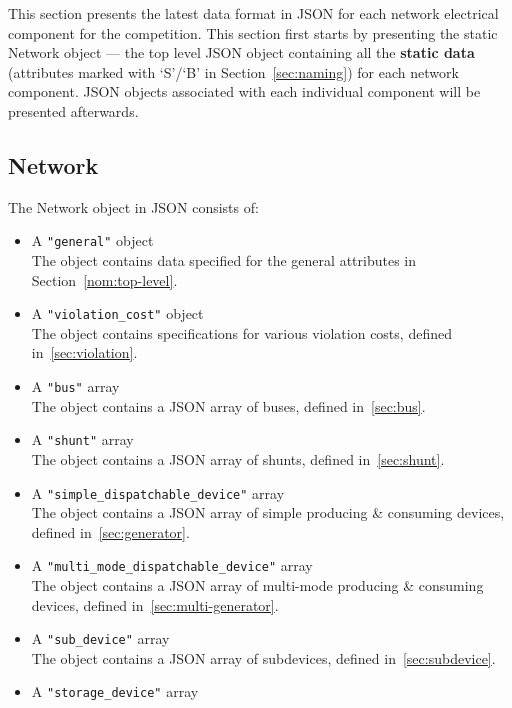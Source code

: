 This section presents the latest data format in JSON for 
each network electrical component for the competition.
This section first starts by presenting the static Network object ---
the top level JSON object containing all the \textbf{static data}
(attributes marked with `S'/`B' in Section~\ref{sec:naming}) for each network component.
JSON objects associated with each individual component will be presented afterwards.

\subsection{Network}
\label{sec:network}
The Network object in JSON consists of: 
\begin{itemize}
    \item A \texttt{"general"} object\\
    The object contains data specified for the general attributes in Section~\ref{nom:top-level}.
    \item A \texttt{"violation\_cost"} object\\
    The object contains specifications for various violation costs, defined in~\ref{sec:violation}.
    \item A \texttt{"bus"} array\\
    The object contains a JSON array of buses, defined in~\ref{sec:bus}.
    \item A \texttt{"shunt"} array\\
    The object contains a JSON array of shunts, defined in~\ref{sec:shunt}.
    \item A \texttt{"simple\_dispatchable\_device"} array\\
    The object contains a JSON array of simple producing \& consuming devices, defined in~\ref{sec:generator}.
    \item A \texttt{"multi\_mode\_dispatchable\_device"} array\\
    The object contains a JSON array of multi-mode producing \& consuming devices, defined in~\ref{sec:multi-generator}.
    \item A \texttt{"sub\_device"} array\\
    The object contains a JSON array of subdevices, defined in~\ref{sec:subdevice}.
    \item A \texttt{"storage\_device"} array\\

\end{itemize}
